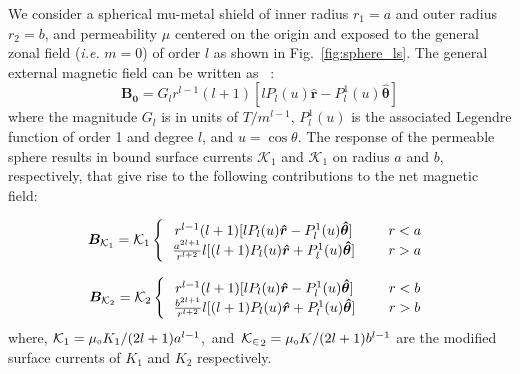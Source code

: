 
We consider a spherical mu-metal shield of inner radius $r_1=a$ and outer radius $r_2=b$, and permeability $\mu$ centered on the origin and exposed to the general zonal field (\textit{i.e.}
$m=0$)
of order $l$ %
as shown in Fig.~\ref{fig:sphere_ls}. The general external magnetic field can be written as~\cite{CB1} :
\begin{equation}\label{bo}
\bm{B_0} = G_l r^{l-1} (l+1)[l P_l(u) \bm{\hat{r}} -  P_l^1(u)  \bm{\hat{\theta}} ] 
\end{equation}
where the magnitude $G_l$ is in units of $T/m^{l-1}$, $P_l^1(u)$ is the associated Legendre function of order 1 and degree $l$, and $u=\cos\theta$.  
 The response of the permeable sphere  results in bound surface currents $\mathcal{K}_1$ and $\mathcal{K}_1$ on radius $a$ and $b$, respectively, that give rise to the following contributions to the net magnetic field:


\begin{equation}\label{r=R}
\bm B_{\mathcal{K}_1} =
\mathcal{K}_1
\left \{
  \begin{tabular}{ccc}
  $r^{l-1}(l+1)[l P_l(u)\bm{\hat{r}} -  P_l^1(u) \bm{\hat{\theta}} ]$ &  & $r<a$  \\
  $\frac{a^{2l+1}}{r^{l+2}}
l[(l+1) P_l(u) \bm{\hat{r}} +  P_l^1(u)  \bm{\hat{\theta}} ]$ &  & $r>a$  
  \end{tabular}
\right. 
\end{equation}

\begin{equation}\label{r=R+t}
\bm B_{\mathcal{K}_2} =\mathcal{K}_2
\left \{
  \begin{tabular}{ccc}
  $r^{l-1} (l+1)[l P_l(u)\bm{\hat{r}} -  P_l^1(u)\bm{\hat{\theta}} ]$ &  & $r<b$  \\
  $\frac{b^{2l+1}}{r^{l+2}}l[(l+1) P_l(u)\bm{\hat{r}} +  P_l^1(u) \bm{\hat{\theta}} ]$ &  & $r>b$  
  \end{tabular}
\right.
\end{equation}
where, $\mathcal{K}_1={\mu_{\scriptscriptstyle 0} K_1}/{(2l+1)a^{l-1}}$,~and~$\mathcal{K_2}_2={\mu_{\scriptscriptstyle 0} K}/{(2l+1)b^{l-1}}$ are the modified surface currents of $K_1$ and $K_2$ respectively.


